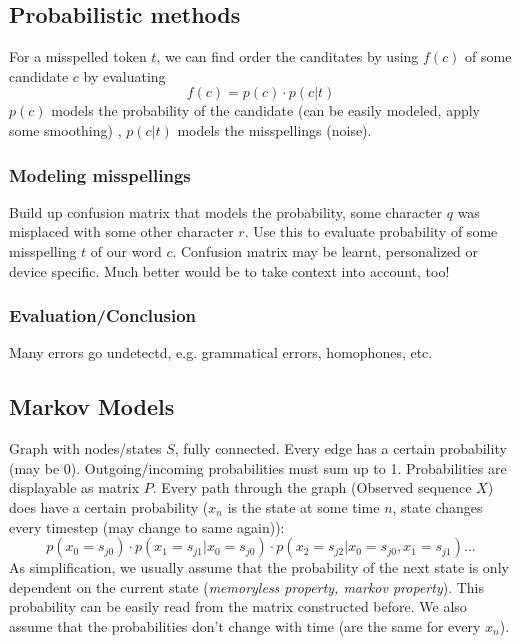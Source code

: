 \documentclass[11pt]{article}
\begin{document}
\subsection{Probabilistic methods}
\label{sub:probabilistic_methods}

For a misspelled token $t$, we can find order the canditates by using $f(c)$ of some 
candidate $c$ by evaluating
\begin{equation}
	f(c) = p(c) \cdot p(c|t)
\end{equation}
$p(c)$ models the probability of the candidate (can be easily modeled, apply some smoothing)
, $p(c|t)$ models the misspellings (noise). 
\subsubsection{Modeling misspellings}
\label{ssub:model_misspellings}
Build up confusion matrix that models the probability, some character $q$ was misplaced with some other character $r$. Use this to evaluate probability of some misspelling $t$ of our word $c$. Confusion matrix may be learnt, personalized or device specific. Much better would be to take context into account, too!


\subsubsection{Evaluation/Conclusion}
Many errors go undetectd, e.g. grammatical errors, homophones, etc.

\subsection{Markov Models}
\label{sec:markov_models}
Graph with nodes/states $S$, fully connected. Every edge has a certain probability 
(may be 0). Outgoing/incoming probabilities must sum up to 1. Probabilities are displayable 
as matrix $P$. Every path through the graph (Observed sequence $X$) does have a certain probability ($x_n$ is the state
at some time $n$, state changes every timestep (may change to same again)):
\begin{equation}
	p(x_0 = s_{j0}) \cdot p(x_1 = s_{j1} |x_0 = s_{j0}) \cdot p(x_2 = s_{j2} | x_0 = s_{j0}, x_1 = s_{j1})\ldots
\end{equation}
As simplification, we usually assume that the probability of the 
next state is only dependent on the current state (\emph{memoryless property, markov property}). This probability can be easily read from the matrix constructed before.
We also assume that the probabilities don't change with time (are the same for every $x_n$).
\end{document}

